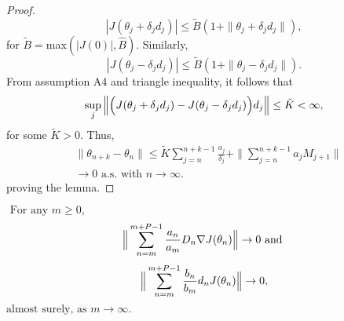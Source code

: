 \begin{proof}
$$|J(\theta_j+\delta_j d_j)|\leq \tilde{B}(1+\|\theta_j+\delta_j d_j\|),$$
for $\tilde{B}=$max$(|J(0)|,\hat{B}).$ Similarly,
$$|J(\theta_j-\delta_j d_j)|\leq \tilde{B}(1+\|\theta_j-\delta_j d_j\|).$$
From assumption A4 and triangle inequality, it follows that
$$\sup_j\Big{\|}\Big{(}J(\theta_j+\delta_j d_j)-J(\theta_j-\delta_j d_j)\Big{)}d_j\Big{\|}\leq \tilde{K}<\infty,$$
for some $\tilde{K}>0.$ Thus,
\begin{align*}
& \|\theta_{n+k}-\theta_n\| \leq \tilde{K}\sum_{j=n}^{n+k-1}\frac{a_j}{\delta_j}+\|\sum_{j=n}^{n+k-1}a_jM_{j+1}\|\\
& \rightarrow 0 \text{ a.s. with } n \rightarrow \infty.
\end{align*}
proving the lemma.
\end{proof}
\begin{lemma}
$\text{ For any } m \geq0,$\\
$$\Big{\|}\sum_{n=m}^{m+P-1}\frac{a_n}{a_m}D_n\nabla J(\theta_n)\Big{\|}\rightarrow 0 \text{ and }$$
$$\Big{\|}\sum_{n=m}^{m+P-1}\frac{b_n}{b_m}d_nJ(\theta_n)\Big{\|}\rightarrow 0,$$
$\text{almost surely, as } m \rightarrow \infty.$
\end{lemma}
